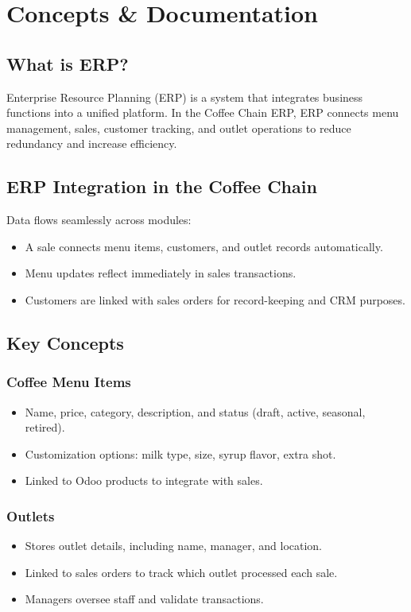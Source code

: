 \chapter{Concepts \& Documentation}

\section*{What is ERP?}
Enterprise Resource Planning (ERP) is a system that integrates business functions into a unified platform. In the Coffee Chain ERP, ERP connects menu management, sales, customer tracking, and outlet operations to reduce redundancy and increase efficiency.

\section*{ERP Integration in the Coffee Chain}
Data flows seamlessly across modules:
\begin{itemize}
    \item A sale connects menu items, customers, and outlet records automatically.  
    \item Menu updates reflect immediately in sales transactions.  
    \item Customers are linked with sales orders for record-keeping and CRM purposes.
\end{itemize}

\section*{Key Concepts}

\subsection*{Coffee Menu Items}
\begin{itemize}
    \item Name, price, category, description, and status (draft, active, seasonal, retired).  
    \item Customization options: milk type, size, syrup flavor, extra shot.  
    \item Linked to Odoo products to integrate with sales.
\end{itemize}

\subsection*{Outlets}
\begin{itemize}
    \item Stores outlet details, including name, manager, and location.  
    \item Linked to sales orders to track which outlet processed each sale.  
    \item Managers oversee staff and validate transactions.
\end{itemize}


